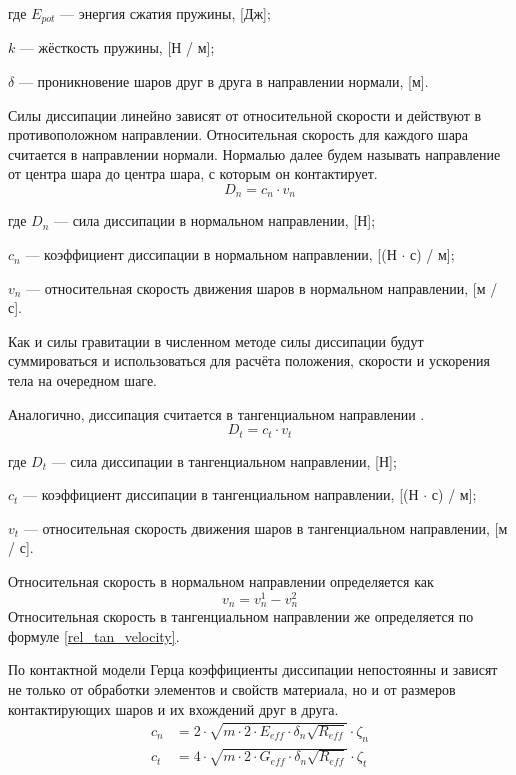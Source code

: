 \documentclass[utf8x, 14pt, oneside, a4paper]{article}
\begin{document}
где $E_{pot}$ --- энергия сжатия пружины, [Дж];

$k$ --- жёсткость пружины, [Н / м];

$\delta$ --- проникновение шаров друг в друга в направлении нормали, [м].

Силы диссипации линейно зависят от относительной скорости и действуют в противоположном направлении.
Относительная скорость для каждого шара считается в направлении нормали.
Нормалью  далее будем называть направление от центра шара до центра шара, с которым он контактирует.
\begin{equation}
\label{dempf_force}
D_n = c_n \cdot v_n
\end{equation}

где $D_n$ --- сила диссипации в нормальном направлении, [Н];

$c_n$ --- коэффициент диссипации в нормальном направлении, [(Н $\cdot$ с) / м];

$v_n$ --- относительная скорость движения шаров в нормальном направлении, [м / с].

Как и силы гравитации в численном методе силы диссипации будут суммироваться и использоваться для расчёта положения, скорости и ускорения тела на очередном шаге.

Аналогично, диссипация считается в тангенциальном направлении \cite{many_pruzhina}.
\begin{equation}
\label{dempf_force_tangent}
D_t = c_t \cdot v_t
\end{equation}

где $D_t$ --- сила диссипации в тангенциальном направлении, [Н];

$c_t$ --- коэффициент диссипации в тангенциальном направлении, [(Н $\cdot$ с) / м];

$v_t$ --- относительная скорость движения шаров в тангенциальном направлении, [м / с].

Относительная скорость в нормальном направлении определяется как
\begin{equation}
v_n = v_n^1 - v_n^2
\end{equation}
Относительная скорость в тангенциальном направлении же определяется по формуле \ref{rel_tan_velocity}.

По контактной модели Герца \cite{aglomerath} коэффициенты диссипации непостоянны и зависят не только от обработки элементов и свойств материала, но и от размеров контактирующих шаров и их вхождений друг в друга.
\begin{align}
\label{kef_dempf}
c_n &= 2 \cdot \sqrt{m \cdot 2 \cdot E_{eff} \cdot \delta_n \sqrt{R_{eff}}} \cdot \zeta_n \\
c_t &= 4 \cdot \sqrt{m \cdot 2 \cdot G_{eff} \cdot \delta_n \sqrt{R_{eff}}} \cdot \zeta_t
\end{align}
\end{document}
